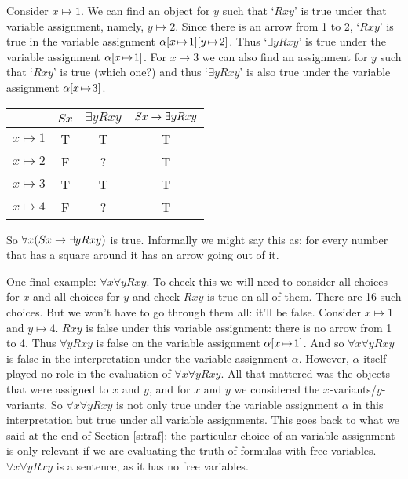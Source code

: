 Consider $x\mapsto 1$. We can find an object for $y$ such that `$Rxy$' is true under that variable assignment, namely, $y\mapsto 2$. Since there is an arrow from 1 to 2, `$Rxy$' is true in the variable assignment $\alpha[x \!\mapsto\! 1][y \!\mapsto\! 2]$. Thus `$\exists y Rxy$' is true under the variable assignment $\alpha[x \!\mapsto\! 1]$. For $x\mapsto 3$ we can also find an assignment for $y$ such that `$Rxy$' is true (which one?) and thus  `$\exists y Rxy$' is also true under the variable assignment $\alpha[x \!\mapsto\! 3]$.
\begin{center}
\begin{tabular}{c|ccc}
&$Sx$&$\exists y Rxy$&$Sx\rightarrow\exists y Rxy$\Bstrut\\\hline\Tstrut
$x\mapsto 1$&T&T&T\\
$x\mapsto 2$&F&?&T\\
$x\mapsto 3$&T&T&T\\
$x\mapsto 4$&F&?&T
\end{tabular}
\end{center}So $\forall x(Sx\rightarrow \exists y Rxy)$ is true. Informally we might say this as: for every number that has a square around it has an arrow going out of it.

One final example: $\forall x\forall y Rxy$. To check this we will need to consider all choices for $x$ and all choices for $y$ and check $Rxy$ is true on all of them. There are 16 such choices. But we won't have to go through them all: it'll be false. Consider $x\mapsto 1$ and $y\mapsto 4$. $Rxy$ is false under this variable assignment: there is no arrow from 1 to 4. Thus $\forall yRxy$ is false on the variable assignment $\alpha[x \!\mapsto\! 1]$. And so $\forall x\forall y Rxy$ is false in the interpretation under the variable assignment $\alpha$. However, $\alpha$ itself played no role in the evaluation of $\forall x\forall y Rxy$. All that mattered was the objects that were assigned to $x$ and $y$, and for $x$ and $y$ we considered the $x$-variants/$y$-variants. So $\forall x\forall y Rxy$ is not only true under the variable assignment $\alpha$ in this interpretation but true under all variable assignments. This goes back to what we said at the end of Section \ref{s:traf}: the particular choice of an variable assignment is only relevant if we are evaluating the truth of formulas with free variables. $\forall x\forall y Rxy$ is a sentence, as it has no free variables.

